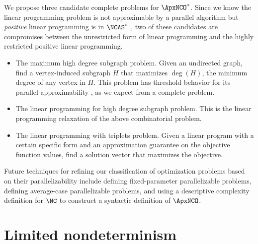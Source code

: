 \documentclass{article}
\begin{document}
We propose three candidate complete problems for $\ApxNCO^*$.
Since we know the linear programming problem is not approximable by a parallel algorithm but \emph{positive} linear programming is in $\NCAS^*$ \autocite{ln93}, two of these candidates are compromises between the unrestricted form of linear programming and the highly restricted positive linear programming.
\begin{itemize}
\item
  The maximum high degree subgraph problem.
  Given an undirected graph, find a vertex-induced subgraph $H$ that maximizes $\deg(H)$, the minimum degree of any vertex in $H$.
  This problem has threshold behavior for its parallel approximability \autocite{am84}, as we expect from a complete problem.
\item
  The linear programming for high degree subgraph problem.
  This is the linear programming relaxation of the above combinatorial problem.
\item
  The linear programming with triplets problem.
  Given a linear program with a certain specific form and an approximation guarantee on the objective function values, find a solution vector that maximizes the objective.
\end{itemize}


Future techniques for refining our classification of optimization problems based on their parallelizability include defining fixed-parameter parallelizable problems, defining average-case parallelizable problems, and using a descriptive complexity definition for $\NC$ to construct a syntactic definition of $\ApxNCO$.

\section{Limited nondeterminism}





\end{document}
